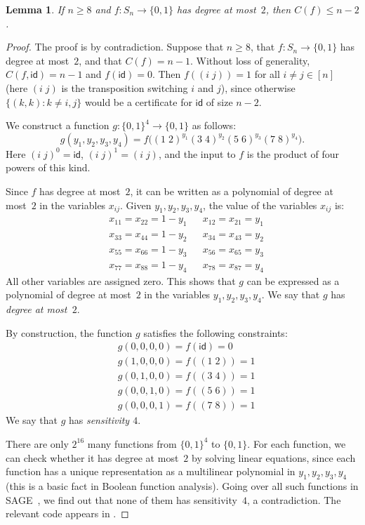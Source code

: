 \documentclass[10pt,a4paper]{amsart}
\newtheorem{lemma}[theorem]{Lemma}
\theoremstyle{definition}
\providecommand{\id}{\mathsf{id}}
\begin{document}
\begin{lemma} \label{lem:C-bound-sym}
If $n \geq 8$ and $f\colon S_n \to \{0,1\}$ has degree at most~$2$, then $C(f) \leq n-2$.
\end{lemma}
\begin{proof}
The proof is by contradiction. Suppose that $n \geq 8$, that $f\colon S_n \to \{0,1\}$ has degree at most~$2$, and that $C(f) = n-1$. Without loss of generality, $C(f,\id) = n-1$ and $f(\id) = 0$. Then $f((i\;j)) = 1$  for all $i \neq j \in [n]$ (here $(i\;j)$ is the transposition switching $i$ and $j$), since otherwise $\{(k,k) : k \neq i,j\}$ would be a certificate for $\id$ of size $n-2$.

We construct a function $g\colon \{0,1\}^4 \to \{0,1\}$ as follows:
\[
 g(y_1,y_2,y_3,y_4) = f\bigl((1\;2)^{y_1} (3\;4)^{y_2} (5\;6)^{y_3} (7\;8)^{y_4}\bigr).
\]
Here $(i\;j)^0 = \id$, $(i\;j)^1 = (i\;j)$, and the input to $f$ is the product of four powers of this kind.

Since $f$ has degree at most~$2$, it can be written as a polynomial of degree at most~$2$ in the variables $x_{ij}$. Given $y_1,y_2,y_3,y_4$, the value of the variables $x_{ij}$ is:
\begin{align*}
    &x_{11} = x_{22} = 1-y_1 && x_{12} = x_{21} = y_1 \\
    &x_{33} = x_{44} = 1-y_2 && x_{34} = x_{43} = y_2 \\
    &x_{55} = x_{66} = 1-y_3 && x_{56} = x_{65} = y_3 \\
    &x_{77} = x_{88} = 1-y_4 && x_{78} = x_{87} = y_4 
\end{align*}
All other variables are assigned zero. This shows that $g$ can be expressed as a polynomial of degree at most~$2$ in the variables $y_1,y_2,y_3,y_4$. We say that $g$ has \emph{degree at most~$2$}. 

By construction, the function $g$ satisfies the following constraints:
\begin{align*}
    &g(0,0,0,0) = f(\id) = 0 \\
    &g(1,0,0,0) = f((1\;2)) = 1 \\
    &g(0,1,0,0) = f((3\;4)) = 1 \\
    &g(0,0,1,0) = f((5\;6)) = 1 \\
    &g(0,0,0,1) = f((7\;8)) = 1 
\end{align*}
We say that $g$ has \emph{sensitivity $4$}.

There are only $2^{16}$ many functions from $\{0,1\}^4$ to $\{0,1\}$. For each function, we can check whether it has degree at most~$2$ by solving linear equations, since each function has a unique representation as a multilinear polynomial in $y_1,y_2,y_3,y_4$ (this is a basic fact in Boolean function analysis). Going over all such functions in SAGE~\cite{sagemath}, we find out that none of them has sensitivity~$4$, a contradiction. The relevant code appears in . 
\end{proof}
\end{document}
